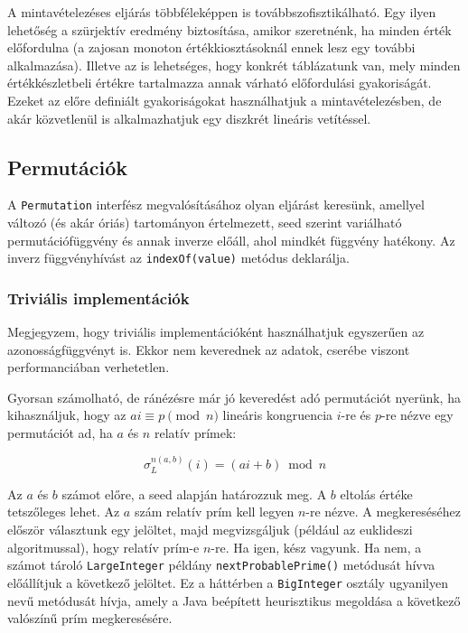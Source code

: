 \documentclass[
    parspace,
    noindent,
    nohyp,
]{elteiktdk}[2023/04/10]
\begin{document}
A mintavételezéses eljárás többféleképpen is továbbszofisztikálható.
Egy ilyen lehetőség a szürjektív eredmény biztosítása, amikor szeretnénk, ha minden érték előfordulna
(a zajosan monoton értékkiosztásoknál ennek lesz egy további alkalmazása).
Illetve az is lehetséges, hogy konkrét táblázatunk van,
mely minden értékkészletbeli értékre tartalmazza annak várható előfordulási gyakoriságát.
Ezeket az előre definiált gyakoriságokat használhatjuk a mintavételezésben,
de akár közvetlenül is alkalmazhatjuk egy diszkrét lineáris vetítéssel.

\subsection{Permutációk}

A \texttt{Permutation} interfész megvalósításához olyan eljárást keresünk, amellyel változó (és akár óriás) tartományon értelmezett,
seed szerint variálható permutációfüggvény és annak inverze előáll, ahol mindkét függvény hatékony.
Az inverz függvényhívást az \texttt{indexOf(value)} metódus deklarálja.

\subsubsection{Triviális implementációk}

Megjegyzem, hogy triviális implementációként használhatjuk egyszerűen az azonosságfüggvényt is.
Ekkor nem keverednek az adatok, cserébe viszont performanciában verhetetlen.

Gyorsan számolható, de ránézésre már jó keveredést adó permutációt nyerünk, ha kihasználjuk, hogy az $ai \equiv p \pmod{n}$ lineáris kongruencia
$i$-re és $p$-re nézve egy permutációt ad, ha $a$ és $n$ relatív prímek:

$$
\sigma_L^{n(a,b)}(i) = (ai + b) \bmod n
$$

Az $a$ és $b$ számot előre, a seed alapján határozzuk meg.
A $b$ eltolás értéke tetszőleges lehet.
Az $a$ szám relatív prím kell legyen $n$-re nézve.
A megkereséséhez először választunk egy jelöltet,
majd megvizsgáljuk (például az euklideszi algoritmussal), hogy relatív prím-e $n$-re.
Ha igen, kész vagyunk.
Ha nem, a számot tároló \texttt{LargeInteger} példány
\texttt{nextProbablePrime()} metódusát hívva előállítjuk a következő jelöltet.
Ez a háttérben a \texttt{BigInteger} osztály ugyanilyen nevű metódusát hívja, amely a Java beépített heurisztikus megoldása a következő valószínű prím megkeresésére.
\end{document}
